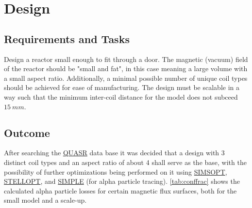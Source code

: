\section{Design}
\subsection{Requirements and Tasks}
Design a reactor small enough to fit through a door.
The magnetic (vacuum) field of the reactor should be "small and fat", in this case meaning a large volume with a small aspect ratio.
Additionally, a minimal possible number of unique coil types should be achieved for ease of manufacturing.
The design must be scalable in a way such that the minimum inter-coil distance for the model does not subceed $15~\unit{mm}$.



\subsection{Outcome}
After searching the \href{https://quasr.flatironinstitute.org/}{QUASR} data base it was decided that \cite{QUASR} a design with 3 distinct coil types and an aspect ratio of about 4 shall serve as the base, with the possibility of further optimizations being performed on it using \href{https://github.com/hiddenSymmetries/simsopt}{SIMSOPT}, \href{https://github.com/PrincetonUniversity/STELLOPT}{STELLOPT}, and \href{https://github.com/itpplasma/SIMPLE}{SIMPLE} (for alpha particle tracing).
\autoref{tab:conffrac} shows the calculated alpha particle losses for certain magnetic flux surfaces, both for the small model and a scale-up.

